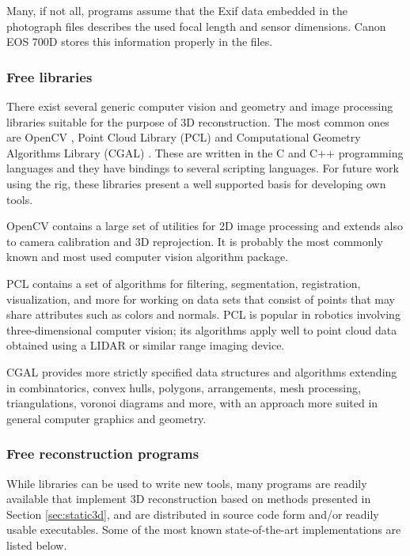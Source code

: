 Many, if not all, programs assume that the Exif data embedded in the photograph files describes the used focal length and sensor dimensions.
Canon EOS 700D stores this information properly in the files.


\subsubsection{Free libraries} %

There exist several generic computer vision and geometry and image processing libraries suitable for the purpose of 3D reconstruction.
The most common ones are OpenCV \cite{opencv}, Point Cloud Library (PCL) \cite{pcl} and Computational Geometry Algorithms Library (CGAL) \cite{cgal}.
These are written in the C and C++ programming languages and they have bindings to several scripting languages.
For future work using the rig, these libraries present a well supported basis for developing own tools.

OpenCV contains a large set of utilities for 2D image processing and extends also to camera calibration and 3D reprojection.
It is probably the most commonly known and most used computer vision algorithm package.

PCL contains a set of algorithms for filtering, segmentation, registration, visualization, and more for working on data sets that consist of points that may share attributes such as colors and normals.
PCL is popular in robotics involving three-dimensional computer vision; its algorithms apply well to point cloud data obtained using a LIDAR or similar range imaging device.

CGAL provides more strictly specified data structures and algorithms extending in combinatorics, convex hulls, polygons, arrangements, mesh processing, triangulations, voronoi diagrams and more, with an approach more suited in general computer graphics and geometry.


\subsubsection{Free reconstruction programs} %

While libraries can be used to write new tools, many programs are readily available that implement 3D reconstruction based on methods presented in Section \ref{sec:static3d}, and are distributed in source code form and/or readily usable executables.
Some of the most known state-of-the-art implementations are listed below.

